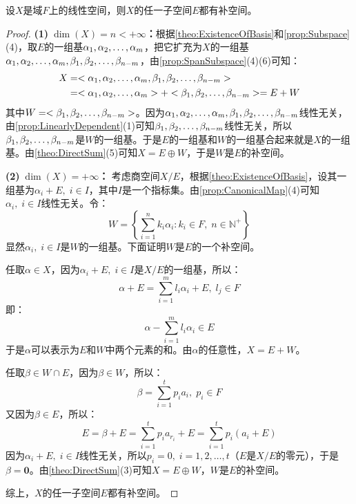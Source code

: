 \begin{theorem}\label{theo:ExistenceOfComplement}
	设$X$是域$F$上的线性空间，则$X$的任一子空间$E$都有补空间。
\end{theorem}
\begin{proof}
	\textbf{(1)$\;\dim(X)=n<+\infty$：}根据\cref{theo:ExistenceOfBasis}和\cref{prop:Subspace}(4)，取$E$的一组基$\alpha_1, \alpha_2, \dots, \alpha_{m}$，把它扩充为$X$的一组基$\alpha_1, \alpha_2, \dots, \alpha_{m},\beta_1, \beta_2, \dots, \beta_{n-m}$，由\cref{prop:SpanSubspace}(4)(6)可知：
	\begin{align*}
		X
		&=<\alpha_1, \alpha_2, \dots, \alpha_{m},\beta_1, \beta_2, \dots, \beta_{n-m}> \\
		&=<\alpha_1, \alpha_2, \dots, \alpha_{m}>+<\beta_1, \beta_2, \dots, \beta_{n-m}>=E+W
	\end{align*}
	其中$W=<\beta_1, \beta_2, \dots, \beta_{n-m}>$。因为$\alpha_1, \alpha_2, \dots, \alpha_{m},\beta_1, \beta_2, \dots, \beta_{n-m}$线性无关，由\cref{prop:LinearlyDependent}(1)可知$\beta_1, \beta_2, \dots, \beta_{n-m}$线性无关，所以$\beta_1, \beta_2, \dots, \beta_{n-m}$是$W$的一组基。于是$E$的一组基和$W$的一组基合起来就是$X$的一组基。由\cref{theo:DirectSum}(5)可知$X=E\oplus W$，于是$W$是$E$的补空间。\par
	\textbf{(2)$\;\dim(X)=+\infty$：}
	考虑商空间$X/E$，根据\cref{theo:ExistenceOfBasis}，设其一组基为$\alpha_i+E,\;i\in I$，其中$I$是一个指标集。由\cref{prop:CanonicalMap}(4)可知$\alpha_i,\;i\in I$线性无关。令：
	\begin{equation*}
		W=\left\{\sum_{i=1}^{n}k_i\alpha_{i}:k_i\in F,\;n\in\mathbb{N}^+\right\}
	\end{equation*}
	显然$\alpha_i,\;i\in I$是$W$的一组基。下面证明$W$是$E$的一个补空间。\par
	任取$\alpha\in X$，因为$\alpha_i+E,\;i\in I$是$X/E$的一组基，所以：
	\begin{equation*}
		\alpha+E=\sum_{i=1}^{m}l_i\alpha_{i}+E,\;l_j\in F
	\end{equation*}
	即：
	\begin{equation*}
		\alpha-\sum_{i=1}^{m}l_i\alpha_{i}\in E
	\end{equation*}
	于是$\alpha$可以表示为$E$和$W$中两个元素的和。由$\alpha$的任意性，$X=E+W$。\par
	任取$\beta\in W\cap E$，因为$\beta\in W$，所以：
	\begin{equation*}
		\beta=\sum_{i=1}^{t}p_ia_{i},\;p_i\in F
	\end{equation*}
	又因为$\beta\in E$，所以：
	\begin{equation*}
		E=\beta+E=\sum_{i=1}^{t}p_ia_{r_i}+E=\sum_{i=1}^{t}p_i(a_{i}+E)
	\end{equation*}
	因为$\alpha_i+E,\;i\in I$线性无关，所以$p_i=0,\;i=1,2,\dots,t$（$E$是$X/E$的零元），于是$\beta=\mathbf{0}$。由\cref{theo:DirectSum}(3)可知$X=E\oplus W$，$W$是$E$的补空间。\par
	综上，$X$的任一子空间$E$都有补空间。
\end{proof}

